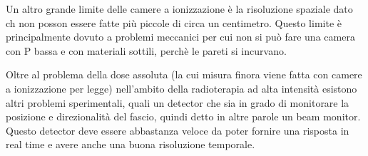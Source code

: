     Un altro grande limite delle camere a ionizzazione è la risoluzione spaziale dato ch non posson essere fatte più piccole di circa un centimetro. Questo limite è principalmente dovuto a problemi meccanici per cui non si può fare una camera con P bassa e con materiali sottili, perchè le pareti si incurvano. 

    Oltre al problema della dose assoluta (la cui misura finora viene fatta con camere a ionizzazione per legge) nell'ambito della radioterapia ad alta intensità esistono altri problemi sperimentali, quali un detector che sia in grado di monitorare la posizione e direzionalità del fascio, quindi detto in altre parole un beam monitor.
    Questo detector deve essere abbastanza veloce da poter fornire una risposta in real time e avere anche una buona risoluzione temporale. 

    




